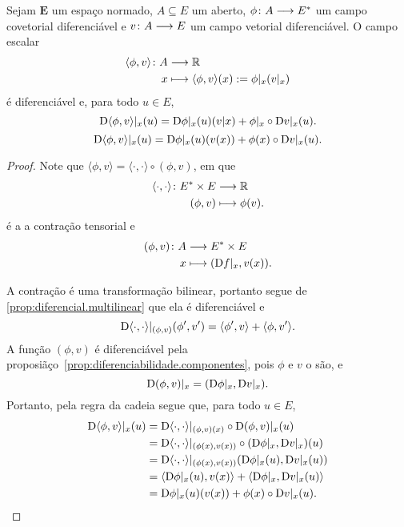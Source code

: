 \begin{proposition}
	Sejam $\bm E$ um espaço normado, $A \subseteq E$ um aberto, $\phi\colon \allowbreak A \longrightarrow E^{\ast}$ um campo covetorial diferenciável e $v\colon \allowbreak A \longrightarrow E$ um campo vetorial diferenciável. O campo escalar
	\begin{align*}
		{\langle \phi, v \rangle}\colon {A} &\longrightarrow {\mathbb{R}} \\{x} &\longmapsto \langle \phi, v \rangle(x) := \phi|_x(v|_x)
	\end{align*}
	é diferenciável e, para todo $u \in E$,
	\begin{equation*}
		\mathrm{D} \langle \phi, v \rangle|_x(u) = \mathrm{D} \phi|_x(u)(v|x) + \phi|_x \circ \mathrm{D} v|_x(u).
	\end{equation*}
	\begin{equation*}
		\mathrm{D} \langle \phi, v \rangle|_x(u) = \mathrm{D} \phi|_x(u)(v(x)) + \phi(x) \circ \mathrm{D} v|_x(u).
	\end{equation*}
\end{proposition}
\begin{proof}
	Note que $\langle \phi, v \rangle = \langle \cdot, \cdot \rangle \circ (\phi,v)$, em que
	\begin{align*}
		{\langle \cdot, \cdot \rangle}\colon {E^{\ast}\times E} &\longrightarrow {\mathbb{R}} \\{(\phi,v)} &\longmapsto \phi(v).
	\end{align*}
	é a a contração tensorial e
	\begin{align*}
		{(\phi, v)}\colon {A} &\longrightarrow {E^{\ast}\times E} \\{x} &\longmapsto (\mathrm{D} f|_x, v(x)).
	\end{align*}
	
	A contração é uma transformação bilinear, portanto segue de \ref{prop:diferencial.multilinear} que ela é diferenciável e
	\begin{equation*}
		\mathrm{D} \langle \cdot, \cdot \rangle|_{(\phi,v)}(\phi',v') = \langle \phi', v \rangle + \langle \phi, v' \rangle.
	\end{equation*}
	A função $(\phi,v)$ é diferenciável pela proposiãço~\ref{prop:diferenciabilidade.componentes}, pois $\phi$ e $v$ o são, e
	\begin{equation*}
		\mathrm{D} (\phi,v)|_x = (\mathrm{D} \phi|_x, \mathrm{D} v|_x).
	\end{equation*}
	Portanto, pela regra da cadeia segue que, para todo $u \in E$,
	\begin{align*}
		\mathrm{D} \langle \phi, v \rangle|_x(u) &= \mathrm{D} \langle \cdot, \cdot \rangle|_{(\phi,v)(x)} \circ \mathrm{D} (\phi,v)|_x(u) \\
			&= \mathrm{D} \langle \cdot, \cdot \rangle|_{(\phi(x),v(x))} \circ (\mathrm{D}\phi|_x,\mathrm{D} v|_x)(u) \\
			&= \mathrm{D} \langle \cdot, \cdot \rangle|_{(\phi(x),v(x))} (\mathrm{D}\phi|_x(u),\mathrm{D} v|_x(u)) \\
			&= \langle \mathrm{D}\phi|_x(u), v(x) \rangle + \langle \mathrm{D}\phi|_x, \mathrm{D} v|_x(u) \rangle \\
			&= \mathrm{D} \phi|_x(u)(v(x)) + \phi(x) \circ \mathrm{D} v|_x(u).
			\qedhere
	\end{align*}
\end{proof}

